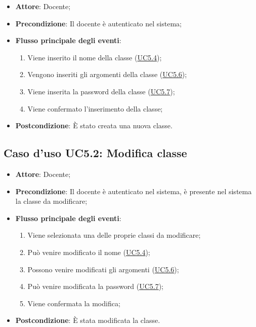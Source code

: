 \documentclass[12pt,a4paper]{article}
\begin{document}
\begin{itemize}

\item \textbf{Attore}: Docente; 
\item \textbf{Precondizione}: Il docente è autenticato nel sistema;

\item \textbf{Flusso principale degli eventi}:
\begin{enumerate}
	\item Viene inserito il nome della classe (\hyperlink{UC5.4}{UC5.4});
	\item Vengono inseriti gli argomenti della classe (\hyperlink{UC5.6}{UC5.6});
	\item Viene inserita la password della classe (\hyperlink{UC5.7}{UC5.7});
	\item Viene confermato l'inserimento della classe;
	
\end{enumerate}
\item \textbf{Postcondizione}: È stato creata una nuova classe.
\end{itemize}
\hypertarget{UC5.2}{}
\subsection{Caso d'uso UC5.2: Modifica classe}

\begin{itemize}

\item \textbf{Attore}: Docente; 
\item \textbf{Precondizione}: Il docente è autenticato nel sistema, è presente nel sistema la classe da modificare;

\item \textbf{Flusso principale degli eventi}:
\begin{enumerate}
	\item Viene selezionata una delle proprie classi da modificare;
	\item Può venire modificato il nome (\hyperlink{UC5.4}{UC5.4});
	\item Possono venire modificati gli argomenti (\hyperlink{UC5.6}{UC5.6});
	\item Può venire modificata la password (\hyperlink{UC5.7}{UC5.7});
	\item Viene confermata la modifica;
	
\end{enumerate}
\item \textbf{Postcondizione}: È stata modificata la classe.
\end{itemize}
\hypertarget{UC5.3}{}
\end{document}
